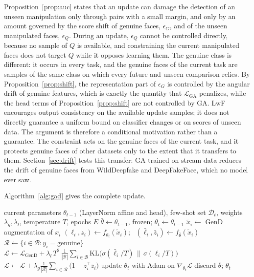 \documentclass[journal]{IEEEtran}
\begin{document}
Proposition~\ref{prop:auc} states that an update can damage the detection of an unseen manipulation only through pairs with a small margin, and only by an amount governed by the score shift of genuine faces, $\epsilon_G$, and of the unseen manipulated faces, $\epsilon_Q$. During an update, $\epsilon_Q$ cannot be controlled directly, because no sample of $Q$ is available, and constraining the current manipulated faces does not target $Q$ while it opposes learning them. The genuine class is different: it occurs in every task, and the genuine faces of the current task are samples of the same class on which every future and unseen comparison relies. By Proposition~\ref{prop:shift}, the representation part of $\epsilon_G$ is controlled by the angular drift of genuine features, which is exactly the quantity that $\mathcal{L}_{\mathrm{GA}}$ penalizes, while the head terms of Proposition~\ref{prop:shift} are not controlled by GA. LwF encourages output consistency on the available update samples; it does not directly guarantee a uniform bound on classifier changes or on scores of unseen data. The argument is therefore a conditional motivation rather than a guarantee. The constraint acts on the genuine faces of the current task, and it protects genuine faces of other datasets only to the extent that it transfers to them. Section~\ref{sec:drift} tests this transfer: GA trained on stream data reduces the drift of genuine faces from WildDeepfake and DeepFakeFace, which no model ever saw.

Algorithm~\ref{alg:gad} gives the complete update.

\begin{algorithm}[t]
\caption{One GA+LwF update on task $\mathcal{T}_t$}
\label{alg:gad}
\footnotesize
\begin{algorithmic}[1]
\Require current parameters $\theta_{t-1}$ (LayerNorm affine and head), few-shot set $\mathcal{D}_t$, weights $\lambda_g,\lambda_l$, temperature $T$, epochs $E$
\State $\bar\theta\gets\theta_{t-1}$, frozen; $\theta_t\gets\theta_{t-1}$
    \State $\tilde x_i\gets$ GenD augmentation of $x_i$
    \State $(\ell_i,z_i)\gets f_{\theta_t}(\tilde x_i)$; \ $(\bar\ell_i,\bar z_i)\gets f_{\bar\theta}(\tilde x_i)$ 
    \State $\mathcal{R}\gets\{i\in\mathcal{B}:y_i=\text{genuine}\}$
    \State $\mathcal{L}\gets\mathcal{L}_{\mathrm{GenD}}+\lambda_l\,T^2\,\frac{1}{|\mathcal{B}|}\sum_{i\in\mathcal{B}}\mathrm{KL}\big(\sigma(\bar\ell_i/T)\,\|\,\sigma(\ell_i/T)\big)$
      \State $\mathcal{L}\gets\mathcal{L}+\lambda_g\frac{1}{|\mathcal{R}|}\sum_{i\in\mathcal{R}}\big(1-z_i^{\top}\bar z_i\big)$
    \EndIf
    \State update $\theta_t$ with Adam on $\nabla_{\theta_t}\mathcal{L}$
  \EndFor
\EndFor
\State discard $\bar\theta$; \Return $\theta_t$ 
\end{algorithmic}
\end{algorithm}
\end{document}
